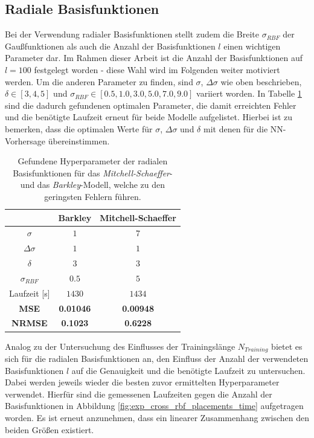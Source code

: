 \subsection{Radiale Basisfunktionen}
Bei der Verwendung radialer Basisfunktionen stellt zudem die Breite $\sigma_{RBF}$ der Gaußfunktionen als auch die Anzahl der Basisfunktionen $l$ einen wichtigen Parameter dar. Im Rahmen dieser Arbeit ist die Anzahl der Basisfunktionen auf $l=100$ festgelegt worden - diese Wahl wird im Folgenden weiter motiviert werden. Um die anderen Parameter zu finden, sind $\sigma$, $\Delta \sigma$ wie oben beschrieben, $\delta \in [3,4,5]$ und $\sigma_{RBF} \in [0.5, 1.0, 3.0, 5.0, 7.0, 9.0]$ variiert worden. In Tabelle \ref{tab:exp_cross_rbf_results} sind die dadurch gefundenen optimalen Parameter, die damit erreichten Fehler und die benötigte Laufzeit erneut für beide Modelle aufgelistet. Hierbei ist zu bemerken, dass die optimalen Werte für $\sigma$, $\Delta \sigma$ und $\delta$ mit denen für die NN-Vorhersage übereinstimmen. 

\begin{table}[h]
	\centering

	\begin{tabular}{|c|c|c|}
		\multicolumn{1}{c|}{} & Barkley & Mitchell-Schaeffer \\ 
		\hline \hline 
		\rule[-1ex]{0pt}{2.5ex} $\sigma$ & $1$ & $7$ \\ 
		\hline 
		\rule[-1ex]{0pt}{2.5ex} $\Delta \sigma$ & $1$ & $1$ \\ 
		\hline 
		\rule[-1ex]{0pt}{2.5ex} $\delta$ & $3$ & $3$ \\ 
		\hline 
		\rule[-1ex]{0pt}{2.5ex} $\sigma_{RBF}$ & $0.5$ & $5$ \\ 
		\hline 
		\rule[-1ex]{0pt}{2.5ex} Laufzeit [s] & $1430$ & $1434$ \\ 
		\hline 
		\rule[-1ex]{0pt}{2.5ex} \textbf{MSE} & \textbf{0.01046} & \textbf{0.00948} \\ 
		\hline 
		\rule[-1ex]{0pt}{2.5ex} \textbf{NRMSE} & \textbf{0.1023} & \textbf{0.6228} \\ 
		\hline 
	\end{tabular} 
	\caption{Gefundene Hyperparameter der radialen Basisfunktionen für das \textit{Mitchell-Schaeffer}- und das \textit{Barkley}-Modell, welche zu den geringsten Fehlern führen.}
	\label{tab:exp_cross_rbf_results}
\end{table} 

Analog zu der Untersuchung des Einflusses der Trainingslänge $N_{Training}$ bietet es sich für die radialen Basisfunktionen an, den Einfluss der Anzahl der verwendeten Basisfunktionen $l$ auf die Genauigkeit und die benötigte Laufzeit zu untersuchen. Dabei werden jeweils wieder die besten zuvor ermittelten Hyperparameter verwendet. Hierfür sind die gemessenen Laufzeiten gegen die Anzahl der Basisfunktionen in Abbildung \ref{fig:exp_cross_rbf_placements_time} aufgetragen worden. Es ist erneut anzunehmen, dass ein linearer Zusammenhang zwischen den beiden Größen existiert.

